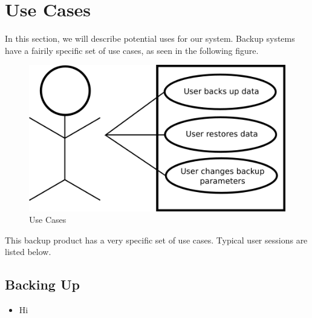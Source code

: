 \section{Use Cases}
In this section, we will describe potential uses for our system. Backup systems have a fairily specific set of use cases, as seen in the following figure.

\begin{figure}[h]
\centering\includegraphics[scale=0.5]{images/senior-design-user-model.png}
\caption{Use Cases}
\end{figure}

This backup product has a very specific set of use cases. Typical user sessions are listed below.

\subsection{Backing Up}
\begin{itemize}
	\item Hi
\end{itemize}

